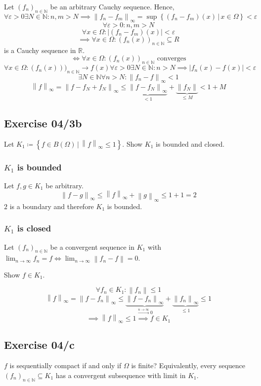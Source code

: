 \documentclass{article}
\newcommand{\setdef}[2]{\left\{\left.#1\,\right|\,#2\right\}}
\newcommand{\norm}[1]{\left\|#1\right\|}
\newcommand{\card}[1]{\left|#1\right|}
\begin{document}
Let $(f_n)_{n \in \mathbb N}$ be an arbitrary Cauchy sequence. Hence,
\[ \forall \varepsilon > 0 \exists N \in \mathbb N: n,m > N \implies \norm{f_n - f_m}_{\infty} = \sup\setdef{(f_n - f_m)(x)}{x \in \Omega} < \varepsilon \]
\[ \forall \varepsilon > 0: n,m > N \]
\[ \forall x \in \Omega: \card{(f_n - f_m)(x)} < \varepsilon \]
\[ \implies \forall x \in \Omega: (f_n(x))_{n \in \mathbb N} \subseteq R \]
is a Cauchy sequence in $\mathbb R$.
\[ \iff \forall x \in \Omega: (f_n(x))_{n \in \mathbb N} \text{ converges} \]
\[ \forall x \in \Omega: (f_n(x)))_{n\in\mathbb N} \to f(x) \forall \varepsilon > 0 \exists N \in \mathbb N: n > N \implies \card{f_n(x) - f(x)} < \varepsilon \]
\[ \exists N \in \mathbb N \forall n > N: \norm{f_n - f}_{\infty} < 1 \]
\[ \norm{f}_{\infty} = \norm{f - f_N + f_N}_{\infty} \leq \underbrace{\norm{f - f_N}_{\infty}}_{<1} + \underbrace{\norm{f_N}}_{\leq M} < 1 + M \]

\subsection{Exercise 04/3b}
Let $K_1 \coloneqq \setdef{f \in B(\Omega)}{\norm{f}_{\infty} \leq 1}$.
Show $K_1$ is bounded and closed.

\subsubsection{$K_1$ is bounded}
Let $f,g \in K_1$ be arbitrary.
\[ \norm{f - g}_{\infty} \leq \norm{f}_{\infty} + \norm{g}_{\infty} \leq 1 + 1 = 2 \]
$2$ is a boundary and therefore $K_1$ is bounded.

\subsubsection{$K_1$ is closed}
Let $(f_n)_{n \in \mathbb N}$ be a convergent sequence in $K_1$
with $\lim_{n\to\infty} f_n = f \iff \lim_{n\to\infty} \norm{f_n - f} = 0$.

Show $f \in K_1$.

\[ \forall f_n \in K_1: \norm{f_n} \leq 1 \]
\[ \norm{f}_{\infty} = \norm{f - f_n}_{\infty} \leq \underbrace{\norm{f - f_n}_{\infty}}_{\xrightarrow{n \to \infty} 0} + \underbrace{\norm{f_n}_{\infty}}_{\leq 1} \leq 1 \]
\[ \implies \norm{f}_{\infty} \leq 1 \implies f \in K_1 \]

\subsection{Exercise 04/c}
$f$ is sequentially compact if and only if $\Omega$ is finite?
Equivalently, every sequence $(f_n)_{n \in \mathbb N} \subseteq K_1$ has a convergent subsequence with limit in $K_1$.
\end{document}
